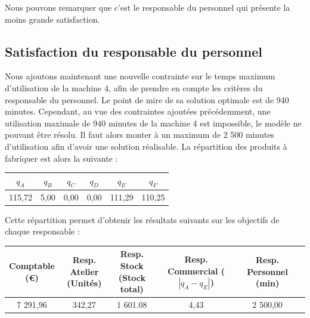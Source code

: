 \documentclass[paper=a4, fontsize=11pt]{report}
\numberwithin{equation}{section}		%
\numberwithin{figure}{section}			%
\numberwithin{table}{section}				%
\newcommand\abs[1]{\left|#1\right|}
\begin{document}
Nous pouvons remarquer que c'est le responsable du personnel qui présente la moins grande satisfaction.

\subsection{Satisfaction du responsable du personnel}

Nous ajoutons maintenant une nouvelle contrainte sur le temps maximum d'utilisation de la machine 4, afin de prendre en compte les critères du responsable du personnel. Le point de mire de sa solution optimale est de 940 minutes. Cependant, au vue des contraintes ajoutées précédemment, une utilisation maximale de 940 minutes de la machine 4 est impossible, le modèle ne pouvant être résolu. Il faut alors monter à un maximum de 2 500 minutes d'utilisation afin d'avoir une solution réalisable. La répartition des produits à fabriquer est alors la suivante :

\begin{center}
\begin{tabular}{cccccc}
\hline
$q_A$ & $q_B$ & $q_C$ & $q_D$ & $q_E$ & $q_F$ \\
\hline
115,72 & 5,00 & 0,00 & 0,00 & 111,29 & 110,25 \\
\hline
\end{tabular}
\end{center}

Cette répartition permet d'obtenir les résultats suivants sur les objectifs de chaque responsable : 

\begin{table}[H]
\begin{center}
\begin{tabular}{c|ccccc}
\shortstack{Comptable \\ \scriptsize{(€)}} & \shortstack{Resp. Atelier \\ \scriptsize (Unités)} & \shortstack{Resp.  Stock \\ \scriptsize (Stock total)} & \shortstack{Resp.  Commercial \\ \scriptsize ($\abs{q_A - q_E}$)} &   \shortstack{Resp.  Personnel \\ \scriptsize (min)} \\ 
\hline 
7 291,96 & 342,27 & 1 601.08 & 4,43 & 2 500,00 \\ 
\end{tabular}
\end{center}
\end{table}
\end{document}
